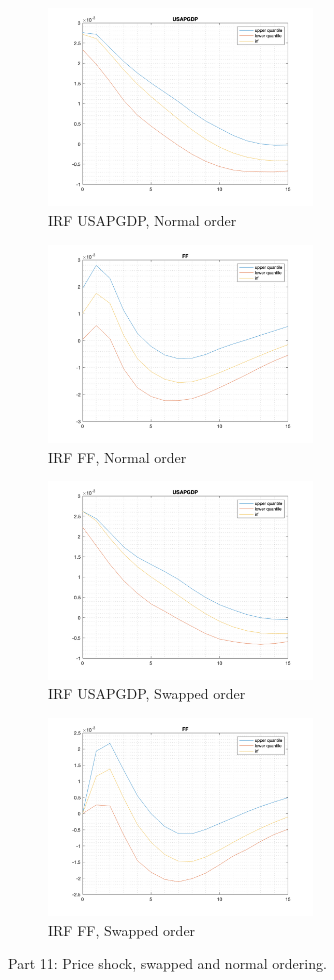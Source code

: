 \documentclass[10pt,letter]{article}
\begin{document}
\begin{figure}
\centering
\begin{subfigure}[b]{0.45\textwidth}
\includegraphics[width=7cm]{ps9fig13}
\caption{IRF USAPGDP, Normal order}
\end{subfigure}
\hfill
\begin{subfigure}[b]{0.45\textwidth}
\includegraphics[width=7cm]{ps9fig13_2}
\caption{IRF FF, Normal order}
\end{subfigure}
\begin{subfigure}[b]{0.45\textwidth}
\includegraphics[width=7cm]{ps9fig13_3}
\caption{IRF USAPGDP, Swapped order}
\end{subfigure}
\hfill
\begin{subfigure}[b]{0.45\textwidth}
\includegraphics[width=7cm]{ps9fig13_4}
\caption{IRF FF, Swapped order}
\end{subfigure}
\caption{Part 11: Price shock, swapped and normal ordering.}
\end{figure}
\end{document}
